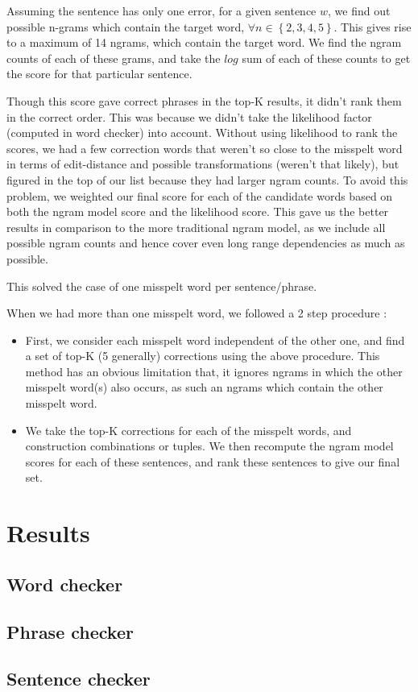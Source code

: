 Assuming the sentence has only one error, for a given sentence $w$, we find out possible n-grams which contain the target word, $\forall n \in \left\lbrace 2,3,4,5 \right\rbrace$. This gives rise to a maximum of 14 ngrams, which contain the target word. We find the ngram counts of each of these grams, and take the $log$ sum of each of these counts to get the score for that particular sentence.



Though this score gave correct phrases in the top-K results, it didn't rank them in the correct order. This was because we didn't take the likelihood factor (computed in word checker) into account. Without using likelihood to rank the scores, we had a few correction words that weren't so close to the misspelt word in terms of edit-distance and possible transformations (weren't that likely), but figured in the top of our list because they had larger ngram counts. To avoid this problem, we weighted our final score for each of the candidate words based on both the ngram model score and the likelihood score. This gave us the better results in comparison to the more traditional ngram model, as we include all possible ngram counts and hence cover even long range dependencies as much as possible.

This solved the case of one misspelt word per sentence/phrase. 

When we had more than one misspelt word, we followed a 2 step procedure :

\begin{itemize}
\item First, we consider each misspelt word independent of the other one, and find a set of top-K (5 generally) corrections using the above procedure. This method has an obvious limitation that, it ignores ngrams in which the other misspelt word(s) also occurs, as such an ngrams which contain the other misspelt word.
\item We take the top-K corrections for each of the misspelt words, and construction combinations or tuples. We then recompute the ngram model scores for each of these sentences, and rank these sentences to give our final set.
\end{itemize}

\section{Results}

\subsection{Word checker}
\subsection{Phrase checker}
\subsection{Sentence checker}

